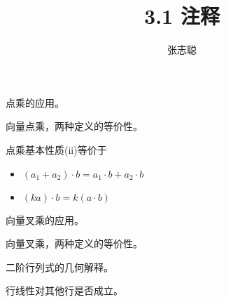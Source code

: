 \documentclass{article}
\begin{document}
\title{3.1 注释}
\author{张志聪}
\maketitle

\begin{zremark}
  点乘的应用。
\end{zremark}

\begin{zremark}
  向量点乘，两种定义的等价性。
\end{zremark}

\begin{zremark}
  点乘基本性质(ii)等价于
  \begin{itemize}
    \item $(a_1 + a_2) \cdot b = a_1 \cdot b + a_2 \cdot b$
    \item $(ka) \cdot b = k (a \cdot b)$
  \end{itemize}
\end{zremark}

\begin{zremark}
  向量叉乘的应用。
\end{zremark}

\begin{zremark}
  向量叉乘，两种定义的等价性。
\end{zremark}

\begin{zremark}
  二阶行列式的几何解释。
\end{zremark}

\begin{zremark}
  行线性对其他行是否成立。
\end{zremark}
\end{document}

